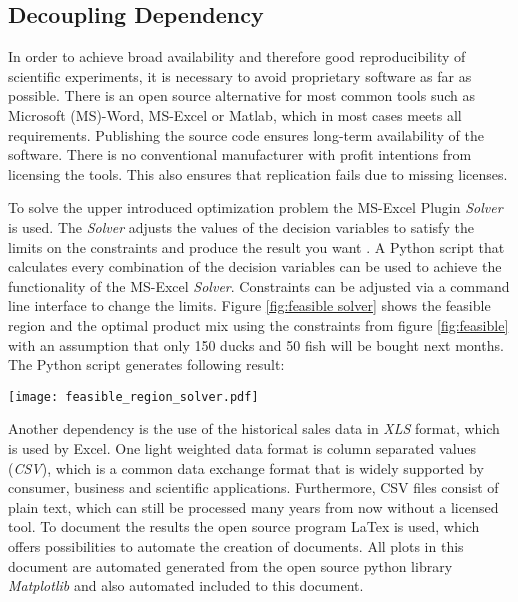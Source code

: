 \documentclass{article}
\begin{document}
\begin{multicols}{2}
\section{Decoupling Dependency}
In order to achieve broad availability and therefore good reproducibility of scientific experiments, it is necessary to avoid proprietary software as far as possible. There is an open source alternative for most common tools such as Microsoft (MS)-Word, MS-Excel or Matlab, which in most cases meets all requirements. Publishing the source code ensures long-term availability of the software. There is no conventional manufacturer with profit intentions from licensing the tools. This also ensures that replication fails due to missing licenses.

To solve the upper introduced optimization problem the MS-Excel Plugin \textit{Solver} is used. The \textit{Solver} adjusts the values of the decision variables to satisfy the limits on the constraints and produce the result you want \cite{microsoft}. A Python script that calculates every combination of the decision variables can be used to achieve the functionality of the MS-Excel \textit{Solver}. Constraints can be adjusted via a command line interface to change the limits. Figure \ref{fig:feasible solver} shows the feasible region and the optimal product mix using the constraints from figure \ref{fig:feasible} with an assumption that only 150 ducks and 50 fish will be bought next months. The Python script generates following result:

\begin{center}
\texttt{[image: feasible\_region\_solver.pdf]}
\label{fig:feasible solver}
\end{center}

Another dependency is the use of the historical sales data in \textit{XLS} format, which is used by Excel. One light weighted data format is column separated values (\textit{CSV}), which is a common data exchange format that is widely supported by consumer, business and scientific applications. Furthermore, CSV files consist of plain text, which can still be processed many years from now without a licensed tool. To document the results the open source program LaTex is used, which offers possibilities to automate the creation of documents. All plots in this document are automated generated from the open source python library \textit{Matplotlib} and also automated included to this document.


\end{multicols}
\end{document}
